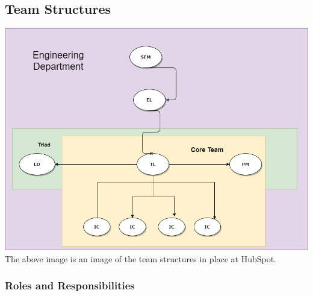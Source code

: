\documentclass[11pt]{article} %
\begin{document}
\subsection{Team Structures}
\includegraphics[scale = 0.5]{Team Structure.png}
The above image is an image of the team structures in place at HubSpot.
\subsubsection{\textbf{Roles and Responsibilities}}
\end{document}
